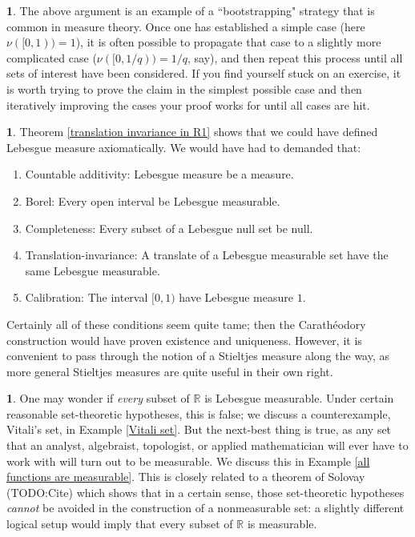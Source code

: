 \documentclass[12pt]{book}
\newcommand{\RR}{\mathbb{R}}
\theoremstyle{definition}
\newtheorem{subsec}[theorem]{}
\begin{document}
\begin{subsec}
The above argument is an example of a ``bootstrapping" strategy that is common in measure theory.
Once one has established a simple case (here $\nu([0, 1)) = 1$), it is often possible to propagate that case to a slightly more complicated case ($\nu([0, 1/q)) = 1/q$, say), and then repeat this process until all sets of interest have been considered.
If you find yourself stuck on an exercise, it is worth trying to prove the claim in the simplest possible case and then iteratively improving the cases your proof works for until all cases are hit.
\end{subsec}

\begin{subsec}
Theorem \ref{translation invariance in R1} shows that we could have defined Lebesgue measure axiomatically. We would have had to demanded that:
\begin{enumerate}
\item Countable additivity: Lebesgue measure be a measure.
\item Borel: Every open interval be Lebesgue measurable.
\item Completeness: Every subset of a Lebesgue null set be null.
\item Translation-invariance: A translate of a Lebesgue measurable set have the same Lebesgue measurable.
\item Calibration: The interval $[0, 1)$ have Lebesgue measure $1$.
\end{enumerate}
Certainly all of these conditions seem quite tame; then the Carathéodory construction would have proven existence and uniqueness.
However, it is convenient to pass through the notion of a Stieltjes measure along the way, as more general Stieltjes measures are quite useful in their own right.
\end{subsec}

\begin{subsec}
One may wonder if \emph{every} subset of $\RR$ is Lebesgue measurable.
Under certain reasonable set-theoretic hypotheses, this is false; we discuss a counterexample, Vitali's set, in Example \ref{Vitali set}.
But the next-best thing is true, as any set that an analyst, algebraist, topologist, or applied mathematician will ever have to work with will turn out to be measurable. We discuss this in Example \ref{all functions are measurable}.
This is closely related to a theorem of Solovay (TODO:Cite) which shows that in a certain sense, those set-theoretic hypotheses \emph{cannot} be avoided in the construction of a nonmeasurable set: a slightly different logical setup would imply that every subset of $\RR$ is measurable.
\end{subsec}
\end{document}
